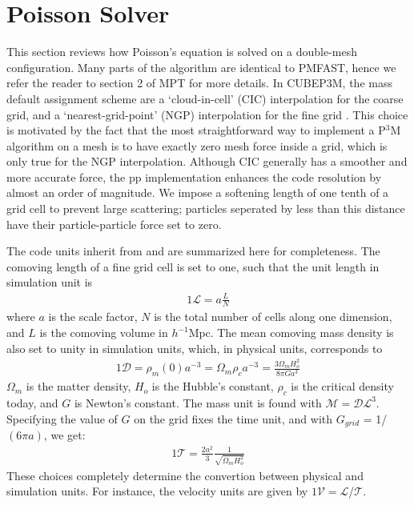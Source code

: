 \section{Poisson Solver}
\label{sec:Poisson}


This section reviews how Poisson's equation is solved on a double-mesh configuration. 
Many parts of the algorithm are identical to {\small PMFAST}, hence we refer the reader 
to section 2 of MPT for more details. In {\small CUBEP3M}, the mass default assignment scheme are
a `cloud-in-cell' (CIC) interpolation for the coarse grid,  and a `nearest-grid-point' (NGP) interpolation 
for the fine grid \citep{1981csup.book.....H}. This choice is motivated by the fact that the most straightforward 
way to implement a P$^3$M algorithm on a mesh is to have exactly zero mesh force inside a grid, 
which is only true for the NGP interpolation. Although CIC generally has a smoother and more accurate force,
the pp implementation enhances the code resolution by almost an order of magnitude. 
We impose a softening length of one tenth of a grid cell to prevent
large scattering; particles seperated by less than this distance have their 
particle-particle force set to zero.

The code units inherit from \citep{2004NewA....9..443T} and are summarized here for completeness.
The comoving length of a fine grid cell is set to one,
such that the unit length in simulation unit is 
\begin{eqnarray}
1\mathcal{L} = a \frac{L}{N} 
\end{eqnarray}
where $a$ is the scale factor, $N$ is the total number of cells along one dimension,
and $L$ is the comoving volume in $h^{-1}\mbox{Mpc}$.
The mean comoving mass density is also set to unity in simulation units, 
which, in physical units, corresponds to 
\begin{eqnarray}
1\mathcal{D} = \rho_{m}(0) a^{-3} = \Omega_{m} \rho_{c} a^{-3} = \frac{3 \Omega_{m} H_{o}^{2}}{8 \pi G a^{3} }
\end{eqnarray}
$\Omega_{m}$ is the matter density, $H_{o}$ is the Hubble's constant, $\rho_{c}$ is the critical density today,
and $G$ is Newton's constant. The mass unit is found with $\mathcal{M} = \mathcal{DL}^{3}$.
Specifying the value of $G$ on the grid fixes the time unit, and with $G_{grid}$ = 1/$(6 \pi a)$,
we get:
\begin{eqnarray}
1 \mathcal{T} = \frac{2a^{2}}{3}\frac{1}{\sqrt{\Omega_{m}H_{o}^{2}}}
\end{eqnarray}
These choices completely determine the convertion between physical and simulation units.
For instance, the velocity units are given by $1\mathcal{V} = \mathcal{L}$/$\mathcal{T}$.



